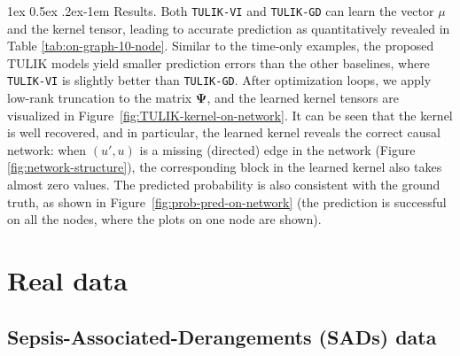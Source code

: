 \documentclass[11pt]{article}
\makeatletter
\theoremstyle{remark}
\theoremstyle{plain}
\renewcommand{\paragraph}{%
  \@startsection{paragraph}{4}%
  {\z@}{1ex \@plus 0.5ex \@minus .2ex}{-1em}%
  {\normalfont\normalsize\itshape}%
}
\makeatother
\begin{document}
\paragraph{Results.} 
Both \texttt{TULIK-VI} and \texttt{TULIK-GD} can learn the vector $\mu$ and the kernel tensor, leading to accurate prediction as quantitatively revealed in Table \ref{tab:on-graph-10-node}.
Similar to the time-only examples, the proposed TULIK models yield smaller prediction errors than the other baselines, where \texttt{TULIK-VI} is slightly better than \texttt{TULIK-GD}. 
%
After optimization loops, we apply low-rank truncation to the matrix $\mathbf{\Psi}$, and the learned kernel tensors are visualized in Figure~\ref{fig:TULIK-kernel-on-network}.
It can be seen that the kernel is well recovered, and in particular, the learned kernel reveals the correct causal network:  when $(u',u)$ is a missing (directed) edge in the network (Figure \ref{fig:network-structure}), the corresponding block in the learned kernel also takes almost zero values.  
%
The predicted probability is also consistent with the ground truth, as shown in Figure~\ref{fig:prob-pred-on-network} (the prediction is successful on all the nodes, where the plots on one node are shown). 


\section{Real data}


\subsection{Sepsis-Associated-Derangements (SADs) data}
\label{subsec:more-on-sepsis}



\begin{table}[b!]
    \centering
        \caption{Selected 13 medical indices in SADs data}
    \label{tab:medical indices}

\end{table}
\end{document}
